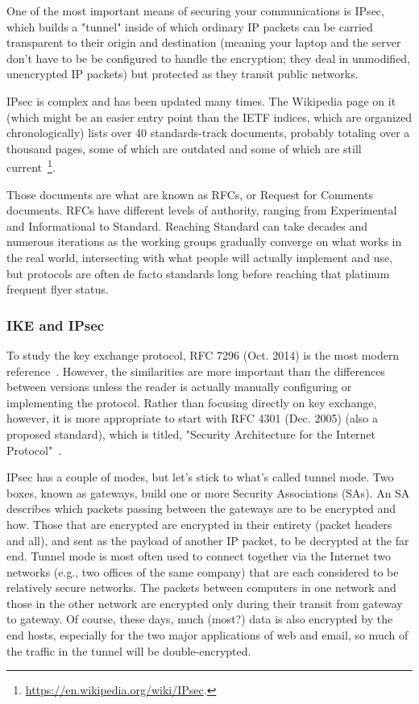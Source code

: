 One of the most important means of securing your communications is
IPsec, which builds a "tunnel" inside of which ordinary IP packets can
be carried transparent to their origin and destination (meaning your
laptop and the server don't have to be be configured to handle the
encryption; they deal in unmodified, unencrypted IP packets) but
protected as they transit public networks.

IPsec is complex and has been updated many times.  The Wikipedia page
on it (which might be an easier entry point than the IETF indices,
which are organized chronologically) lists over 40 standards-track
documents, probably totaling over a thousand pages, some of which are
outdated and some of which are still
current~\footnote{\url{https://en.wikipedia.org/wiki/IPsec}.}.

Those documents are what are known as RFCs, or Request for Comments
documents.  RFCs have different levels of authority, ranging from
Experimental and Informational to Standard.  Reaching Standard can
take decades and numerous iterations as the working groups gradually
converge on what works in the real world, intersecting with what
people will actually implement and use, but protocols are often de
facto standards long before reaching that platinum frequent flyer
status. 

\subsubsection{IKE and IPsec}

To study the key exchange protocol, RFC 7296 (Oct. 2014) is the most
modern reference~\cite{RFC7296}.  However, the similarities are more
important than the differences between versions unless the reader is
actually manually configuring or implementing the protocol.  Rather
than focusing directly on key exchange, however, it is more
appropriate to start with RFC 4301 (Dec. 2005) (also a proposed
standard), which is titled, "Security Architecture for the Internet
Protocol"~\cite{RFC4301}.

 IPsec has a couple of modes, but let's stick to
what's called tunnel mode.  Two boxes, known as gateways, build one or
more Security Associations (SAs). An SA describes which packets
passing between the gateways are to be encrypted and how.  Those that
are encrypted are encrypted in their entirety (packet headers and
all), and sent as the payload of another IP packet, to be decrypted at
the far end.  Tunnel mode is most often used to connect together via
the Internet two networks (e.g., two offices of the same company) that
are each considered to be relatively secure networks.   The packets between computers in one network and those in
the other network are encrypted only during their transit from gateway
to gateway.  Of course, these days, much (most?) data is also
encrypted by the end hosts, especially for the two major applications
of web and email, so much of the traffic in the tunnel will be
double-encrypted.


